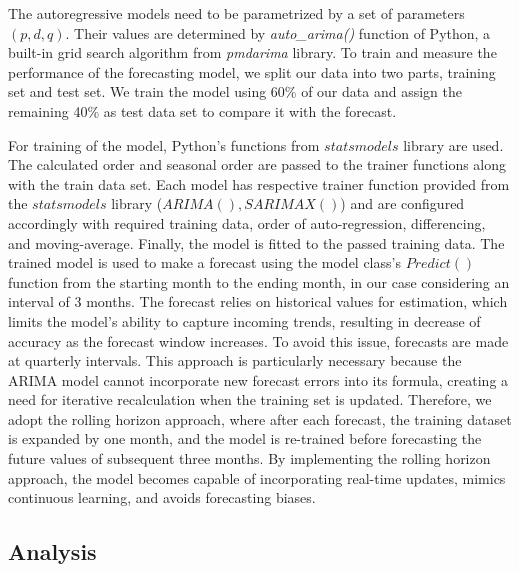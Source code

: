 \documentclass[acmtog]{acmart}
\begin{document}
The autoregressive models need to be parametrized by a set of parameters ${(p, d, q)}$. Their values are determined by \textit{auto\_arima()}\cite{smith2020automated} function of Python, a built-in grid search algorithm from \textit{pmdarima} library.
To train and measure the performance of the forecasting model, we split our data into two parts, training set and test set. We train the model using 60\% of our data and assign the remaining 40\% as test data set to compare it with the forecast.

For training of the model, Python's functions from ${statsmodels}$ library\cite{raschka2019hands} are used. The calculated order and seasonal order are passed to the trainer functions along with the train data set. Each model has respective trainer function provided from the ${statsmodels}$ library (${ARIMA(), SARIMAX()}$)\cite{medium_time_series_forecasting} and are configured accordingly with required training data, order of auto-regression, differencing, and moving-average. Finally, the model is fitted to the passed training data. 
The trained model is used to make a forecast using the model class's ${Predict()}$\cite{medium_time_series_forecasting} function from the starting month to the ending month, in our case considering an interval of 3 months.
The forecast relies on historical values for estimation, which limits the model's ability to capture incoming trends, resulting in decrease of accuracy as the forecast window increases. To avoid this issue, forecasts are made at quarterly intervals. This approach is particularly necessary because the ARIMA model cannot incorporate new forecast errors into its formula, creating a need for iterative recalculation when the training set is updated. Therefore, we adopt the rolling horizon approach, where after each forecast, the training dataset is expanded by one month, and the model is re-trained before forecasting the future values of subsequent three months. By implementing the rolling horizon approach, the model becomes capable of incorporating real-time updates, mimics continuous learning, and avoids forecasting biases.

\subsection{ Analysis}
\end{document}
